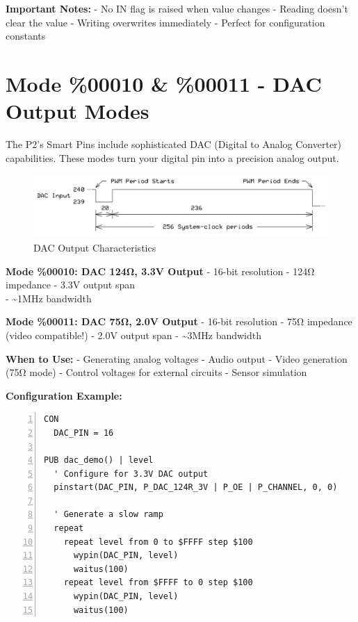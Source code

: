 \documentclass[11pt,a4paper,oneside,english]{book}
\begin{document}
\textbf{Important Notes:} - No IN flag is raised when value changes -
Reading doesn't clear the value - Writing overwrites immediately -
Perfect for configuration constants

\clearpage

\hypertarget{mode-00010-00011---dac-output-modes}{%
\section{Mode \%00010 \& \%00011 - DAC Output
Modes}\label{mode-00010-00011---dac-output-modes}}

The P2's Smart Pins include sophisticated DAC (Digital to Analog
Converter) capabilities. These modes turn your digital pin into a
precision analog output.

\begin{figure}
\centering
\includegraphics{assets/P2 SmartPins-220809_page13_img01.png}
\caption{DAC Output Characteristics}
\end{figure}

\textbf{Mode \%00010: DAC 124Ω, 3.3V Output} - 16-bit resolution - 124Ω
impedance - 3.3V output span\\
- \textasciitilde1MHz bandwidth

\textbf{Mode \%00011: DAC 75Ω, 2.0V Output} - 16-bit resolution - 75Ω
impedance (video compatible!) - 2.0V output span - \textasciitilde3MHz
bandwidth

\textbf{When to Use:} - Generating analog voltages - Audio output -
Video generation (75Ω mode) - Control voltages for external circuits -
Sensor simulation

\textbf{Configuration Example:}

\begin{Spin2Block}
\begin{Verbatim}[numbers=left,numbersep=5pt,xleftmargin=15pt]
CON
  DAC_PIN = 16
  
PUB dac_demo() | level
  ' Configure for 3.3V DAC output
  pinstart(DAC_PIN, P_DAC_124R_3V | P_OE | P_CHANNEL, 0, 0)
  
  ' Generate a slow ramp
  repeat
    repeat level from 0 to $FFFF step $100
      wypin(DAC_PIN, level)
      waitus(100)
    repeat level from $FFFF to 0 step $100
      wypin(DAC_PIN, level)  
      waitus(100)
\end{Verbatim}
\end{Spin2Block}
\end{document}
